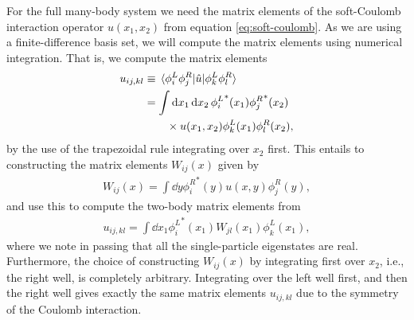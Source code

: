 \documentclass[twocolumn,superscriptaddress,unsortedaddress,
 amsmath,amssymb,
 aps,
]{revtex4-2}
\begin{document}
        For the full many-body system we need the matrix elements of the
        soft-Coulomb interaction operator $u(x_1, x_2)$ from
        equation \eqref{eq:soft-coulomb}.
        As we are using a finite-difference basis set, we will compute the matrix
        elements using numerical integration.
        That is, we compute the matrix elements
        \begin{align}
            u_{ij, kl}
            &\equiv \mel*{\phi^L_i\phi^R_j}{\hat{u}}{\phi^L_k\phi^R_l}
            \\
            &= \int\dd{x_1} \dd{x_2}
            {\phi^L_i}^{*}(x_1) {\phi^R_j}^{*}(x_2)
            \nonumber \\
            &\qquad
            \times
            u(x_1, x_2)
            \phi^L_k(x_1)\phi^R_l(x_2),
            \label{eq:two-body-coulomb}
        \end{align}
        by the use of the trapezoidal rule integrating over $x_2$ first.
        This entails to constructing the matrix elements $W_{ij}(x)$
        given by
        \begin{align*}
            W_{ij}(x)
            = \int \dd{y} {\phi^R_i}^{*}(y) u(x, y) \phi^R_j(y),
        \end{align*}
        and use this to compute the two-body matrix elements from
        \begin{align*}
            u_{ij, kl}
            = \int \dd{x_1} {\phi^{L}_{i}}^{*}(x_1)
            W_{jl}(x_1) \phi^L_k(x_1),
        \end{align*}
        where we note in passing that all the single-particle eigenstates
        are real.
        Furthermore, the choice of constructing $W_{ij}(x)$ by integrating
        first over $x_2$, i.e., the right well, is completely arbitrary.
        Integrating over the left well first, and then the right well gives
        exactly the same matrix elements $u_{ij, kl}$ due to the symmetry
        of the Coulomb interaction.
\end{document}
